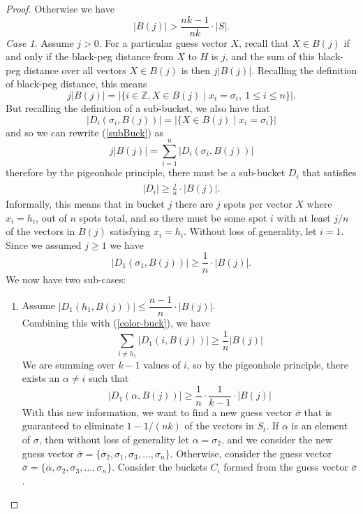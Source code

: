 \documentclass[12pt, a4paper]{article}
\newcommand{\Z}{\mathbb{Z}}           %
\begin{document}
\begin{proof}
	Otherwise we have
	\begin{equation*}
	|B(j)|>\frac{nk - 1}{nk}\cdot|S|.
	\end{equation*}
	\textit{Case 1.} Assume $j>0$. For a particular guess vector $X$, recall that $X \in B(j)$ if and only if the black-peg distance from $X$ to $H$ is $j$, and the sum of this black-peg distance over all vectors $X \in B(j)$ is then $j|B(j)|$. Recalling the definition of black-peg distance, this means 
	\begin{equation}\label{subBuck}
	j|B(j)| = \left|\{i\in\Z, X \in B(j) \mid x_i = \sigma_i,~ 1\le i\le n\}\right|.
	\end{equation}
	But recalling the definition of a sub-bucket, we also have that 
	\begin{equation*}
	|D_i(\sigma_i,B(j))| = \left|\{X \in B(j) \mid x_i = \sigma_i\}\right|
	\end{equation*}
	and so we can rewrite (\ref{subBuck}) as
	\begin{equation*}
	j|B(j)| = \sum_{i=1}^n |D_i(\sigma_i,B(j))|
	\end{equation*}
	therefore by the pigeonhole principle, there must be a sub-bucket $D_i$
	that satisfies
	\begin{align*}
	|D_i| \geq \frac{j}{n}\cdot|B(j)|.
	\end{align*}
	Informally, this means that in bucket $j$ there are $j$ spots per vector $X$ where $x_i = h_i$, out of $n$ spots total, and so there must be some spot $i$ with at least $j/n$ of the vectors in $B(j)$ satisfying $x_i = h_i$. Without loss of generality, let $i = 1$. Since we assumed $j \geq 1$ we have
	\begin{equation}\label{subBuckBound}
	|D_{1}(\sigma_1, B(j))|\ge \frac{1}{n}\cdot|B(j)|.
	\end{equation}
	We now have two sub-cases:
	\begin{enumerate}[label=\roman*.]
		\item Assume $|D_{1}(h_1, B(j))|\le \dfrac{n-1}{n}\cdot|B(j)|$.\\
		Combining this with (\ref{color-buck}), we have
		\begin{equation*}
		\sum_{i \neq h_1} |D_1(i,B(j))| \geq \frac{1}{n}|B(j)|
		\end{equation*}
		We are summing over $k-1$ values of $i$, so by the
		pigeonhole principle, there exists an $\alpha \neq i$ such that 
		\begin{equation}\label{pigeon}
		|D_1(\alpha,B(j))| \ge \frac{1}{n}\cdot\frac{1}{k-1}\cdot|B(j)|
		\end{equation}
		With this new information, we want to find a new guess vector $\overline{\sigma}$ that is guaranteed to eliminate $1-1/(nk)$ of the vectors in $S_t$. If $\alpha$ is an element of $\sigma$, then without loss of generality let $\alpha = \sigma_2$, and
		we consider the new guess vector
		$\overline{\sigma}=\{\sigma_2, \sigma_1, \sigma_3, \ldots, \sigma_n\}$.
		Otherwise, consider the guess vector
		$\overline{\sigma}=\{\alpha, \sigma_2, \sigma_3, \ldots, \sigma_n\}$.
		Consider the buckets $C_i$ formed from the guess vector
		$\overline{\sigma}$. 
		

\end{enumerate}
\end{proof}
\end{document}

